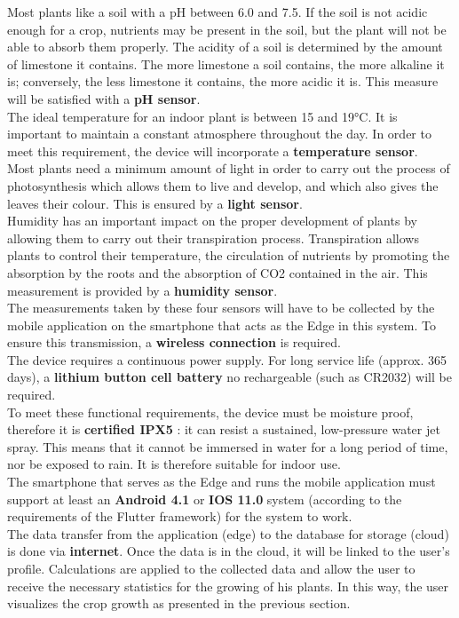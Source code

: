 Most plants like a soil with a pH between 6.0 and 7.5. If the soil is not acidic
enough for a crop, nutrients may be present in the soil, but the plant will not
be able to absorb them properly. The acidity of a soil is determined by the amount
of limestone it contains. The more limestone a soil contains, the more alkaline it is;
conversely, the less limestone it contains, the more acidic it is. This measure
will be satisfied with a \textbf{pH sensor}. \\
The ideal temperature for an indoor plant is between 15 and 19°C. It is important
to maintain a constant atmosphere throughout the day. In order to meet this requirement,
the device will incorporate a \textbf{temperature sensor}. \\
Most plants need a minimum amount of light in order to carry out the process of
photosynthesis which allows them to live and develop, and which also gives the
leaves their colour. This is ensured by a \textbf{light sensor}. \\
Humidity has an important impact on the proper development of plants by allowing
them to carry out their transpiration process. Transpiration allows plants to control
their temperature, the circulation of nutrients by promoting the absorption by the
roots and the absorption of CO2 contained in the air. This measurement is provided
by a \textbf{humidity sensor}. \\
The measurements taken by these four sensors will have to be collected by the mobile
application on the smartphone that acts as the Edge in this system. To ensure this
transmission, a \textbf{wireless connection} is required. \\
The device requires a continuous power supply. For long service life (approx. 365
days), a \textbf{lithium button cell battery} no rechargeable (such as CR2032) will be required. \\
To meet these functional requirements, the device must be moisture proof, therefore
it is \textbf{certified IPX5} : it can resist a sustained, low-pressure water jet
spray. This means that it cannot be immersed in water for a long period of time,
nor be exposed to rain. It is therefore suitable for indoor use. \\
The smartphone that serves as the Edge and runs the mobile application must support
at least an \textbf{Android 4.1} or \textbf{IOS 11.0} system (according to the requirements
of the Flutter framework) for the system to work. \\
The data transfer from the application (edge) to the database for storage (cloud)
is done via \textbf{internet}. Once the data is in the cloud, it will be linked to
the user's profile. Calculations are applied to the collected data and allow the
user to receive the necessary statistics for the growing of his plants. In this way,
the user visualizes the crop growth as presented in the previous section.
